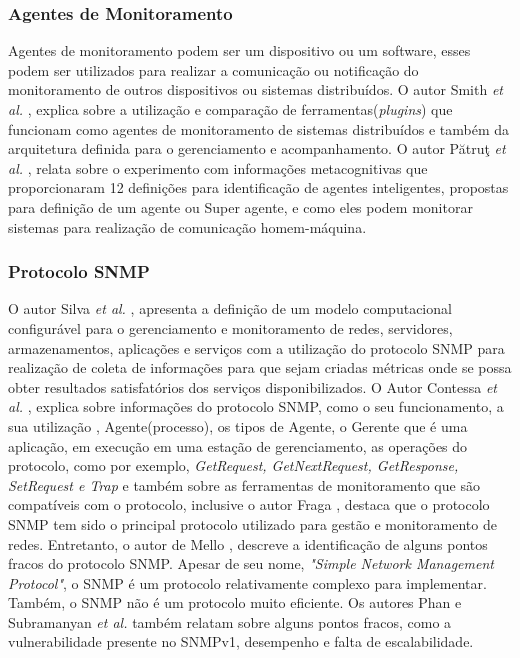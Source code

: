 \subsubsection{Agentes de Monitoramento}

Agentes de monitoramento podem ser um dispositivo ou um software, esses podem ser utilizados para realizar a comunicação ou notificação do monitoramento de outros dispositivos ou sistemas distribuídos. O autor Smith \textit{et al.} \cite{smith2008flexible}, explica sobre a utilização e comparação de ferramentas(\textit{plugins}) que funcionam como agentes de monitoramento de sistemas distribuídos e também da arquitetura definida para o gerenciamento e acompanhamento. O autor Pătruţ \textit{et al.} \cite{puatruct2010agent}, relata sobre o experimento com informações metacognitivas que proporcionaram 12 definições para identificação de agentes inteligentes, propostas para definição de um agente ou Super agente, e como eles podem monitorar sistemas para realização de comunicação homem-máquina.

\subsubsection{Protocolo SNMP}
\label{snmpDescription}

O autor Silva \textit{et al.} \cite{da2014arquitetura}, apresenta a definição de um modelo computacional configurável para o gerenciamento e monitoramento de redes, servidores, armazenamentos, aplicações e serviços com a utilização do protocolo SNMP para realização de coleta de informações para que sejam criadas métricas onde se possa obter resultados satisfatórios dos serviços disponibilizados. O Autor Contessa \textit{et al.} \cite{contessa2010gerenciamento}, explica sobre informações do protocolo SNMP, como o seu funcionamento, a sua utilização , Agente(processo), os tipos de Agente, o Gerente que é uma aplicação, em execução em uma estação de gerenciamento, as operações do protocolo, como por exemplo, \textit{GetRequest, 	GetNextRequest,  GetResponse,  SetRequest  e Trap} e também sobre as ferramentas de monitoramento que são compatíveis com o protocolo, inclusive o autor Fraga \cite{Fraga}, destaca que o protocolo \acrshort{SNMP} tem sido o principal protocolo utilizado para gestão e monitoramento de redes. Entretanto, o autor de Mello \cite{deMello}, descreve a identificação de alguns pontos fracos do protocolo \acrshort{SNMP}. Apesar  de  seu  nome,  \textit{"Simple  Network  Management  Protocol"},  o  \acrshort{SNMP}  é  um protocolo  relativamente  complexo  para  implementar.  Também,  o  \acrshort{SNMP}  não  é  um protocolo muito eficiente. Os autores Phan e Subramanyan \textit{et al.} \cite{phan2009cryptanalysis,subramanyan2000scalable} também relatam sobre alguns pontos fracos, como a vulnerabilidade presente no SNMPv1, desempenho e falta de escalabilidade.

